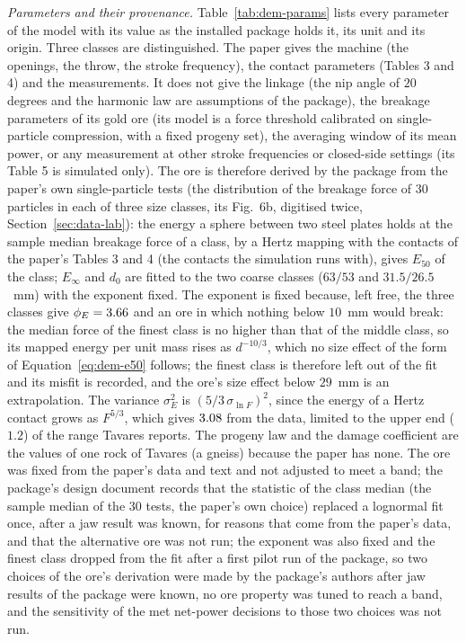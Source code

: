 \emph{Parameters and their provenance.} Table~\ref{tab:dem-params} lists every parameter of the model with its value as the installed package holds it, its unit and its origin. Three classes are distinguished. The paper gives the machine (the openings, the throw, the stroke frequency), the contact parameters (Tables 3 and 4) and the measurements. It does not give the
linkage (the nip angle of $20$ degrees and the harmonic law are assumptions of the package), the breakage parameters of its gold ore (its model is a force threshold calibrated on single-particle compression, with a fixed progeny set), the averaging window of its mean power, or any measurement at other stroke frequencies or closed-side settings
(its Table 5 is simulated only). The ore is therefore derived by the package from the paper's own single-particle tests (the distribution of the breakage force of $30$ particles in each of three size classes, its Fig.~6b, digitised twice, Section~\ref{sec:data-lab}): the energy a sphere between two steel plates holds at the sample median breakage force of a class, by a Hertz mapping with the contacts of the
paper's Tables 3 and 4 (the contacts the simulation runs with), gives $E_{50}$ of the class; $E_{\infty}$ and $d_0$ are fitted to the two coarse classes ($63/53$ and $31.5/26.5$~mm) with the exponent fixed. The exponent is fixed because, left free, the three classes give $\phi_E=3.66$ and an ore in which nothing below $10$~mm would break: the median force of the finest class
is no higher than that of the middle class, so its mapped energy per unit mass rises as $d^{-10/3}$, which no size effect of the form of Equation~\eqref{eq:dem-e50} follows; the finest class is therefore left out of the fit and its misfit is recorded, and the ore's size effect below $29$~mm is an extrapolation. The variance $\sigma_E^2$ is $(5/3\,\sigma_{\ln F})^2$, since the energy of a Hertz contact grows as
$F^{5/3}$, which gives $3.08$ from the data, limited to the upper end ($1.2$) of the range Tavares reports. The progeny law and the damage coefficient are the values of one rock of Tavares (a gneiss) because the paper has none. The ore was fixed from the paper's data and text and not adjusted to meet a band; the package's design document records that the statistic of the class median (the sample median of the $30$ tests, the paper's own choice) replaced a lognormal fit once, after a jaw result was known, for reasons that come from the paper's data, and that the alternative ore was not run; the exponent was also fixed and the finest class dropped from the fit after a first pilot run of the package, so two choices of the ore's derivation were made by the package's authors after jaw results of the package were known, no ore property was tuned to reach a band, and the sensitivity of the met net-power decisions to those two choices was not run.

